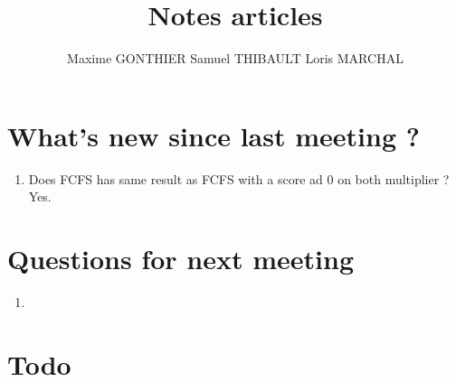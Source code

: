 \documentclass[a4paper]{article}
\title{Notes articles}
\author{Maxime GONTHIER Samuel THIBAULT Loris MARCHAL}
\begin{document}
\newpage

\section{What's new since last meeting ?}

	\begin{enumerate}
		\item Does FCFS has same result as FCFS with a score ad 0 on both multiplier ? Yes.
	\end{enumerate}
	
\section{Questions for next meeting}

	\begin{enumerate}
		\item
	\end{enumerate}

\section{Todo}
\end{document}
